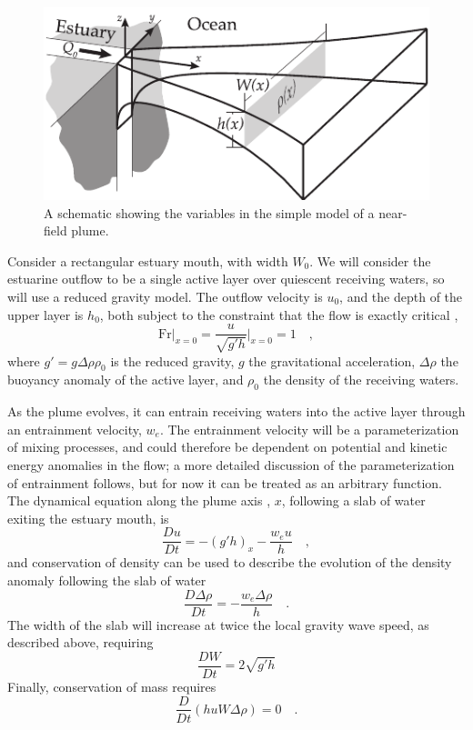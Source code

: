\documentclass[12pt]{article}
\begin{document}
\begin{figure}
    \centering
    \includegraphics[width=5in]{Figures/plume_vars_flat.pdf}
    \caption{A schematic showing the variables in the simple model of a near-field plume.}
    \label{fig:plume_vars}
\end{figure}

Consider a rectangular estuary mouth, with width $W_0$. We will consider the estuarine outflow to be a single active layer over quiescent receiving waters, so will use a reduced gravity model. The outflow velocity is $u_0$, and the depth of the upper layer is $h_0$, both subject to the constraint that the flow is exactly critical \cite[i.e., the mouth acts as a constriction, see][]{armi.farmer:86, farmer.armi:86},
\begin{equation}
    \mathrm{Fr}\bigg|_{x=0} = \frac{u}{\sqrt{g' h}}\bigg|_{x=0} = 1 \quad ,
\end{equation}
where $g' = g \Delta \rho \rho_0$ is the reduced gravity, $g$ the gravitational acceleration, $\Delta \rho$ the buoyancy anomaly of the active layer, and  $\rho_0$ the density of the receiving waters.

As the plume evolves, it can entrain receiving waters into the active layer through an entrainment velocity, $w_e$. The entrainment velocity will be a parameterization of mixing processes, and could therefore be dependent on potential and kinetic energy anomalies in the flow; a more detailed discussion of the parameterization of entrainment follows, but for now it can be treated as an arbitrary function. The dynamical equation along the plume axis , $x$, following a slab of water exiting the estuary mouth, is
\begin{equation}
    \frac{Du}{Dt} = -(g' h)_x - \frac{w_e u}{h} \quad ,
\end{equation}
and conservation of density can be used to describe the evolution of the density anomaly following the slab of water
\begin{equation}
    \frac{D \Delta\rho}{Dt} = -\frac{w_e \Delta\rho}{h} \quad .
\end{equation}
The width of the slab will increase at twice the local gravity wave speed, as described above, requiring
\begin{equation}
    \frac{D W}{Dt} = 2 \sqrt{g' h}
\end{equation}
Finally, conservation of mass requires
\begin{equation}
    \frac{D}{Dt}\left( h u W \Delta\rho \right) = 0 \quad .
\end{equation}
\end{document}
